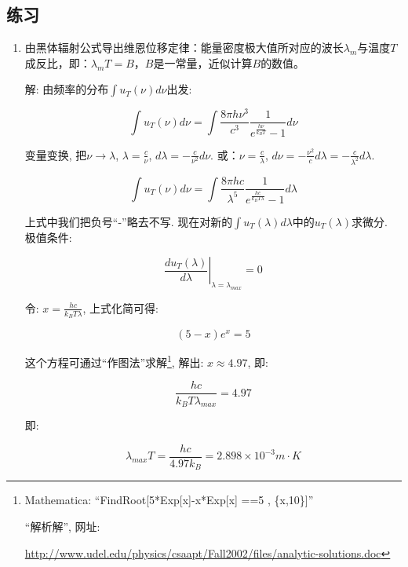 \subsection*{练习}


\begin{enumerate}

\item 由黑体辐射公式导出维恩位移定律：能量密度极大值所对应的波长$\lambda_m$与温度$T$成反比，即：$\lambda_m T = B$，$B$是一常量，近似计算$B$的数值。

解: 由频率的分布$\int u_T(\nu) d\nu$出发:

\begin{equation*}
\int u_T(\nu)d\nu =\int  \frac{8\pi h
\nu^3}{c^3}\frac{1}{e^{\frac{h\nu}{k_B T}} -1} d \nu
\end{equation*}

变量变换, 把$\nu \to \lambda$, $\lambda = \frac{c}{\nu}$, $d \lambda
= - \frac{c}{\nu^2} d \nu$. 或：$\nu = \frac{c}{\lambda}$, $d\nu = -
\frac{\nu^2}{c} d\lambda=-\frac{c}{\lambda^2}d\lambda$.


\begin{equation*}
\int u_T(\nu) d \nu = \int \frac{8\pi
hc}{\lambda^5}\frac{1}{e^{\frac{hc}{k_B T\lambda}}-1} d\lambda
\end{equation*}

上式中我们把负号``-''略去不写. 现在对新的$\int u_T(\lambda)
d\lambda$中的$u_T(\lambda)$求微分. 极值条件:

\begin{equation*}
\left. {\frac{d u_T(\lambda)}{d\lambda}} \right|_{\lambda =
\lambda_{max}} = 0
\end{equation*}

令: $x = \frac{hc}{k_B T \lambda}$, 上式化简可得:

\begin{equation*}
(5-x)e^x =5
\end{equation*}

这个方程可通过``作图法''求解\footnote{Mathematica:
``FindRoot[5*Exp[x]-x*Exp[x] ==5 , \{x,10\}]''

``解析解'', 网址:

\url{http://www.udel.edu/physics/csaapt/Fall2002/files/analytic-solutions.doc}},
解出: $x \approx 4.97$, 即:

\begin{equation*}
\frac{hc}{k_B T \lambda_{max}} = 4.97
\end{equation*}

即:

\begin{equation*}
    \lambda_{max} T =\frac{hc}{4.97 k_B} = 2.898 \times 10^{-3} m \cdot K
\end{equation*}


\end{enumerate}
